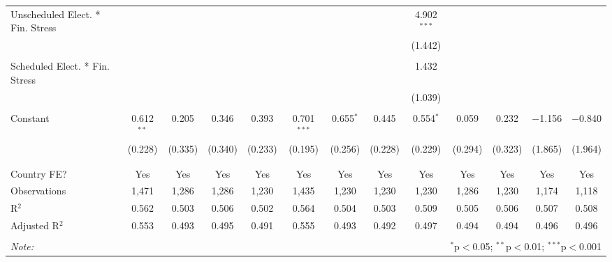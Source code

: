 \begin{table}[!htbp]
\begin{tabular}{@{\extracolsep{5pt}}lcccccccccccc}
 Unscheduled Elect. * Fin. Stress &  &  &  &  &  &  &  & 4.902$^{***}$ &  &  &  &  \\ 
  &  &  &  &  &  &  &  & (1.442) &  &  &  &  \\ 
  & & & & & & & & & & & & \\ 
 Scheduled Elect. * Fin. Stress &  &  &  &  &  &  &  & 1.432 &  &  &  &  \\ 
  &  &  &  &  &  &  &  & (1.039) &  &  &  &  \\ 
  & & & & & & & & & & & & \\ 
 Constant & 0.612$^{**}$ & 0.205 & 0.346 & 0.393 & 0.701$^{***}$ & 0.655$^{*}$ & 0.445 & 0.554$^{*}$ & 0.059 & 0.232 & $-$1.156 & $-$0.840 \\ 
  & (0.228) & (0.335) & (0.340) & (0.233) & (0.195) & (0.256) & (0.228) & (0.229) & (0.294) & (0.323) & (1.865) & (1.964) \\ 
  & & & & & & & & & & & & \\ 
\hline \\[-1.8ex] 
Country FE? & Yes & Yes & Yes & Yes & Yes & Yes & Yes & Yes & Yes & Yes & Yes & Yes \\ 
Observations & 1,471 & 1,286 & 1,286 & 1,230 & 1,435 & 1,230 & 1,230 & 1,230 & 1,286 & 1,230 & 1,174 & 1,118 \\ 
R$^{2}$ & 0.562 & 0.503 & 0.506 & 0.502 & 0.564 & 0.504 & 0.503 & 0.509 & 0.505 & 0.506 & 0.507 & 0.508 \\ 
Adjusted R$^{2}$ & 0.553 & 0.493 & 0.495 & 0.491 & 0.555 & 0.493 & 0.492 & 0.497 & 0.494 & 0.494 & 0.496 & 0.496 \\ 
\hline 
\hline \\[-1.8ex] 
\textit{Note:}  & \multicolumn{12}{r}{$^{*}$p$<$0.05; $^{**}$p$<$0.01; $^{***}$p$<$0.001} \\ 
\end{tabular} 
\end{table} 

